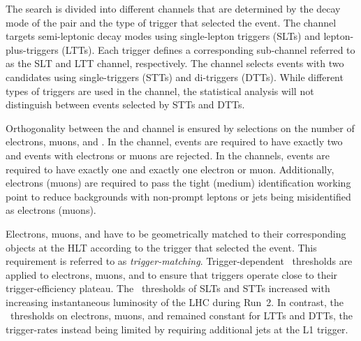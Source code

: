 The search is divided into different channels that are determined by the decay
mode of the \taulepton pair and the type of trigger that selected the event. The
\lephad channel targets semi-leptonic decay modes using single-lepton triggers
(SLTs) and lepton-plus-\tauhadvis triggers (LTTs). Each trigger defines a
corresponding sub-channel referred to as the \lephad SLT and \lephad LTT
channel, respectively. The \hadhad channel selects events with two \tauhadvis
candidates using single-\tauhadvis triggers (STTs) and di-\tauhadvis triggers
(DTTs). While different types of triggers are used in the \hadhad channel, the
statistical analysis will not distinguish between events selected by STTs and
DTTs.


Orthogonality between the \lephad and \hadhad channel is ensured by selections
on the number of electrons, muons, and \tauhadvis. In the \hadhad channel,
events are required to have exactly two \tauhadvis and events with electrons or
muons are rejected. In the \lephad channels, events are required to have exactly
one \tauhadvis and exactly one electron or muon. Additionally, electrons (muons)
are required to pass the tight (medium) identification working point to reduce
backgrounds with non-prompt leptons or jets being misidentified as electrons
(muons).

Electrons, muons, and \tauhadvis have to be geometrically matched to their
corresponding objects at the HLT according to the trigger that selected the
event. This requirement is referred to as
\emph{trigger-matching}. Trigger-dependent \pT~thresholds are applied to
electrons, muons, and \tauhadvis to ensure that triggers operate close to their
trigger-efficiency plateau. The \pT~thresholds of SLTs and STTs increased with
increasing instantaneous luminosity of the LHC during Run~2. In contrast, the
\pT~thresholds on electrons, muons, and \tauhadvis remained constant for LTTs
and DTTs, the trigger-rates instead being limited by requiring additional jets
at the L1 trigger.


